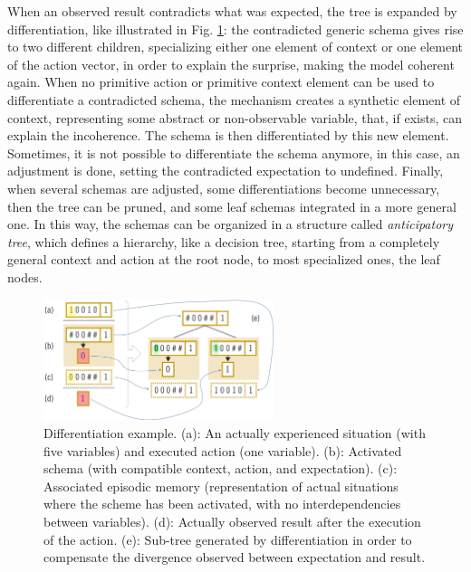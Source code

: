 \documentclass[runningheads]{llncs}
\begin{document}
When an observed result contradicts what was expected, the tree is expanded by differentiation, like illustrated in Fig. \ref{fig:perotto_diff}: the contradicted generic schema gives rise to two different children, specializing either one element of context or one element of the action vector, in order to explain the surprise, making the model coherent again.
When no primitive action or primitive context element can be used to differentiate a contradicted schema, the mechanism creates a synthetic element of context, representing some abstract or non-observable variable, that, if exists, can explain the incoherence. 
The schema is then differentiated by this new element.
Sometimes, it is not possible to differentiate the schema anymore, in this case, an adjustment is done, setting the contradicted expectation to undefined.
Finally, when several schemas are adjusted, some differentiations become unnecessary, then the tree can be pruned, and some leaf schemas integrated in a more general one.
In this way, the schemas can be organized in a structure called \textit{anticipatory tree}, 
which defines a hierarchy, like a decision tree, starting from a completely general context and action at the root node, to most specialized ones, the leaf nodes.
%
\begin{figure}
	\centering
	\includegraphics[width=0.6\textwidth]{Figure_perotto_differentiation_arrows.png}
	\caption{Differentiation example. 
	(a): An actually experienced situation (with five variables) and executed action (one variable). 
	(b): Activated schema (with compatible context, action, and expectation).
	(c): Associated episodic memory (representation of actual situations where the scheme has been activated, with no interdependencies between variables).
    (d): Actually observed result after the execution of the action.
    (e): Sub-tree generated by differentiation in order to compensate the divergence observed between expectation and result.} 
	\label{fig:perotto_diff}
\end{figure}
\end{document}
